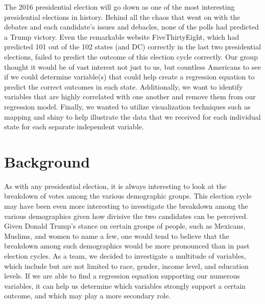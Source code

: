 \documentclass{article}
\begin{document}
{The 2016 presidential election will go down as one of the most interesting presidential elections in history. Behind all the chaos that went on with the debates and each candidate's issues and debacles, none of the polls had predicted a Trump victory. Even the remarkable website FiveThirtyEight, which had predicted 101 out of the 102 states (and DC) correctly in the last two presidential elections, failed to predict the outcome of this election cycle correctly. Our group thought it would be of vast interest not just to us, but countless Americans to see if we could determine variable(s) that could help create a regression equation to predict the correct outcomes in each state. Additionally, we want to identify variables that are highly correlated with one another and remove them from our regression model. Finally, we wanted to utilize visualization techniques such as mapping and shiny to help illustrate the data that we received for each individual state for each separate independent variable.


\section{Background}


As with any presidential election, it is always interesting to look at the breakdown of votes among the various demographic groups. This election cycle may have been even more interesting to investigate the breakdown among the various demographics given how divisive the two candidates can be perceived. Given Donald Trump's stance on certain groups of people, such as Mexicans, Muslims, and women to name a few, one would tend to believe that the breakdown among such demographics would be more pronounced than in past election cycles. As a team, we decided to investigate a multitude of variables, which include but are not limited to race, gender, income level, and education levels. If we are able to find a regression equation supporting our numerous variables, it can help us determine which variables strongly support a certain outcome, and which may play a more secondary role.


}
\end{document}
